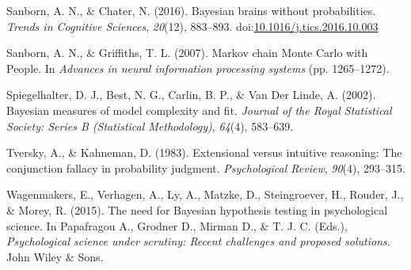 \documentclass[english,floatsintext,man]{apa6}
\begin{document}
\hypertarget{ref-sanborn2016bayesian}{}
Sanborn, A. N., \& Chater, N. (2016). Bayesian brains without
probabilities. \emph{Trends in Cognitive Sciences}, \emph{20}(12),
883--893.
doi:\href{https://doi.org/10.1016/j.tics.2016.10.003}{10.1016/j.tics.2016.10.003}

\hypertarget{ref-sanborn2007markov}{}
Sanborn, A. N., \& Griffiths, T. L. (2007). Markov chain Monte Carlo
with People. In \emph{Advances in neural information processing systems}
(pp. 1265--1272).

\hypertarget{ref-spiegelhalter2002bayesian}{}
Spiegelhalter, D. J., Best, N. G., Carlin, B. P., \& Van Der Linde, A.
(2002). Bayesian measures of model complexity and fit. \emph{Journal of
the Royal Statistical Society: Series B (Statistical Methodology)},
\emph{64}(4), 583--639.

\hypertarget{ref-tversky1983extensional}{}
Tversky, A., \& Kahneman, D. (1983). Extensional versus intuitive
reasoning: The conjunction fallacy in probability judgment.
\emph{Psychological Review}, \emph{90}(4), 293--315.

\hypertarget{ref-wagenmakers2015need}{}
Wagenmakers, E., Verhagen, A., Ly, A., Matzke, D., Steingroever, H.,
Rouder, J., \& Morey, R. (2015). The need for Bayesian hypothesis
testing in psychological science. In Papafragou A., Grodner D., Mirman
D., \& T. J. C. (Eds.), \emph{Psychological science under scrutiny:
Recent challenges and proposed solutions}. John Wiley \& Sons.
\end{document}
